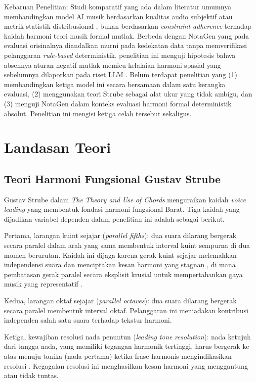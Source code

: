 Kebaruan Penelitian: Studi komparatif yang ada dalam literatur umumnya membandingkan model AI musik berdasarkan kualitas audio subjektif atau metrik statistik distribusional \parencite{Retkowski2024, wu2020}, bukan berdasarkan \textit{constraint adherence} terhadap kaidah harmoni teori musik formal mutlak. Berbeda dengan NotaGen yang pada evaluasi orisinalnya diandalkan murni pada kedekatan data tanpa memverifikasi pelanggaran \textit{rule-based} deterministik, penelitian ini menguji hipotesis bahwa absennya aturan negatif mutlak memicu kelalaian harmoni spasial yang sebelumnya dilaporkan pada riset LLM \parencite{Zhou2024, Ji2023}. Belum terdapat penelitian yang (1) membandingkan ketiga model ini secara bersamaan dalam satu kerangka evaluasi, (2) menggunakan teori Strube sebagai alat ukur yang tidak ambigu, dan (3) menguji NotaGen dalam konteks evaluasi harmoni formal deterministik absolut. Penelitian ini mengisi ketiga celah tersebut sekaligus.

\section{Landasan Teori}

\subsection{Teori Harmoni Fungsional Gustav Strube}

Gustav Strube dalam \textit{The Theory and Use of Chords} \parencite{strube1928} menguraikan kaidah \textit{voice leading} yang membentuk fondasi harmoni fungsional Barat. Tiga kaidah yang dijadikan variabel dependen dalam penelitian ini adalah sebagai berikut.

Pertama, larangan kuint sejajar (\textit{parallel fifths}): dua suara dilarang bergerak secara paralel dalam arah yang sama membentuk interval kuint sempurna di dua momen berurutan. Kaidah ini dijaga karena gerak kuint sejajar melemahkan independensi suara dan menciptakan kesan harmoni yang stagnan \parencite{harrison2020}, di mana pembatasan gerak paralel secara eksplisit krusial untuk mempertahankan gaya musik yang representatif \parencite{choi2020}.

Kedua, larangan oktaf sejajar (\textit{parallel octaves}): dua suara dilarang bergerak secara paralel membentuk interval oktaf. Pelanggaran ini meniadakan kontribusi independen salah satu suara terhadap tekstur harmoni.

Ketiga, kewajiban resolusi nada penuntun (\textit{leading tone resolution}): nada ketujuh dari tangga nada, yang memiliki tegangan harmonik tertinggi, harus bergerak ke atas menuju tonika (nada pertama) ketika frase harmonis mengindikasikan resolusi \parencite{schoenberg1954}. Kegagalan resolusi ini menghasilkan kesan harmoni yang menggantung atau tidak tuntas.

